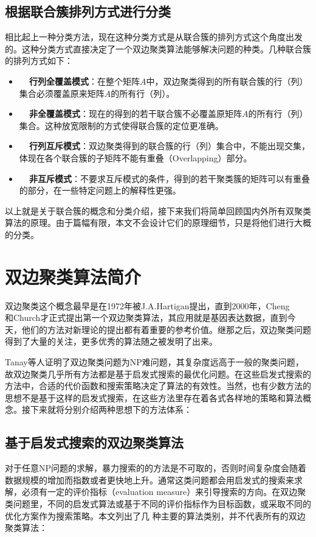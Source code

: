 \subsection{根据联合簇排列方式进行分类}
相比起上一种分类方法，现在这种分类方式是从联合簇的排列方式这个角度出发的。这种分类方式直接决定了一个双边聚类算法能够解决问题的种类。几种联合簇的排列方式如下：
\begin{itemize}
  \item \textbf{~~行列全覆盖模式}：在整个矩阵$A$中，双边聚类得到的所有联合簇的行（列）集合必须覆盖原来矩阵$A$的所有行（列）。
  \item \textbf{~~非全覆盖模式}：现在的得到的若干联合簇不必覆盖原矩阵$A$的所有行（列）集合。这种放宽限制的方式使得联合簇的定位更准确。
  \item \textbf{~~行列互斥模式}：双边聚类得到的联合簇的行（列）集合中，不能出现交集，体现在各个联合簇的子矩阵不能有重叠（Overlapping）部分。
  \item \textbf{~~非互斥模式}：不要求互斥模式的条件，得到的若干聚类簇的矩阵可以有重叠的部分，在一些特定问题上的解释性更强。
\end{itemize}

以上就是关于联合簇的概念和分类介绍，接下来我们将简单回顾国内外所有双聚类算法的原理。由于篇幅有限，本文不会设计它们的原理细节，只是将他们进行大概的分类。

\section{双边聚类算法简介}
\label{sec:algorithms}
双边聚类这个概念最早是在1972年被J.A.Hartigan\cite{hartigan1972direct}提出，直到2000年，Cheng\\和Church\cite{cheng2000biclustering}才正式提出第一个双边聚类算法，其应用就是基因表达数据，直到今天，他们的方法对新理论的提出都有着重要的参考价值。继那之后，双边聚类问题得到了大量的关注，更多优秀的算法随之被发明了出来。

Tanay等人\cite{tanay2002discovering}证明了双边聚类问题为NP难问题，其复杂度远高于一般的聚类问题，故双边聚类几乎所有方法都是基于启发式搜索的最优化问题。在这些启发式搜索的方法中，合适的代价函数和搜索策略决定了算法的有效性。当然，也有少数方法的思想不是基于这样的启发式搜索，在这些方法里存在着各式各样地的策略和算法概念。接下来就将分别介绍两种思想下的方法体系：

\subsection{基于启发式搜索的双边聚类算法}
\label{search}
对于任意NP问题的求解，暴力搜索的的方法是不可取的，否则时间复杂度会随着数据规模的增加而指数或者更快地上升。通常这类问题都会用启发式的搜索来求解，必须有一定的评价指标（evaluation measure）来引导搜索的方向。在双边聚类问题里，不同的启发式算法或基于不同的评价指标作为目标函数，或采取不同的优化方案作为搜索策略。本文列出了几
种主要的算法类别，并不代表所有的双边聚类算法：

